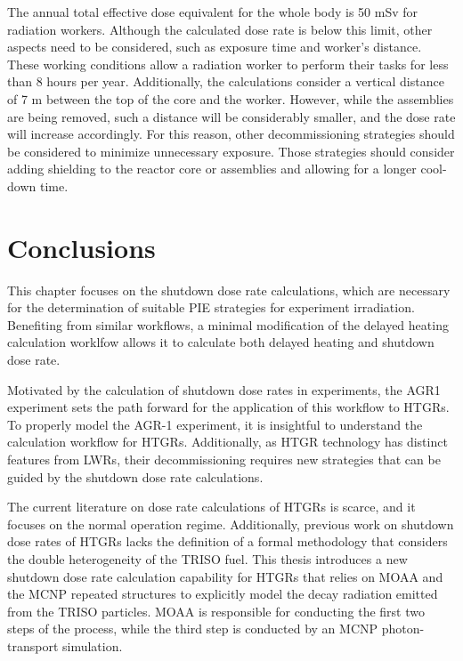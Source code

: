 The annual total effective dose equivalent for the whole body is 50 mSv for radiation workers.
Although the calculated dose rate is below this limit, other aspects need to be considered, such as exposure time and worker's distance.
These working conditions allow a radiation worker to perform their tasks for less than 8 hours per year.
Additionally, the calculations consider a vertical distance of 7 m between the top of the core and the worker.
However, while the assemblies are being removed, such a distance will be considerably smaller, and the dose rate will increase accordingly.
For this reason, other decommissioning strategies should be considered to minimize unnecessary exposure.
Those strategies should consider adding shielding to the reactor core or assemblies and allowing for a longer cool-down time.


\section{Conclusions}
\label{sec:conclusion}

This chapter focuses on the shutdown dose rate calculations, which are necessary for the determination of suitable \gls*{PIE} strategies for experiment irradiation.
Benefiting from similar workflows, a minimal modification of the delayed heating calculation worklfow allows it to calculate both delayed heating and shutdown dose rate.

Motivated by the calculation of shutdown dose rates in experiments, the \gls*{AGR1} experiment sets the path forward for the application of this workflow to \glspl*{HTGR}.
To properly model the AGR-1 experiment, it is insightful to understand the calculation workflow for HTGRs.
Additionally, as \gls*{HTGR} technology has distinct features from \glspl*{LWR}, their decommissioning requires new strategies that can be guided by the shutdown dose rate calculations.

The current literature on dose rate calculations of HTGRs is scarce, and it focuses on the normal operation regime.
Additionally, previous work on shutdown dose rates of HTGRs lacks the definition of a formal methodology that considers the double heterogeneity of the TRISO fuel.
This thesis introduces a new shutdown dose rate calculation capability for HTGRs that relies on MOAA and the MCNP repeated structures to explicitly model the decay radiation emitted from the TRISO particles.
MOAA is responsible for conducting the first two steps of the process, while the third step is conducted by an MCNP photon-transport simulation.

